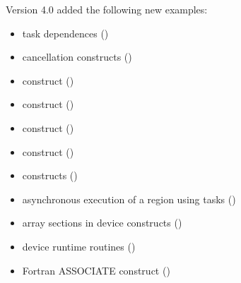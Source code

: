 Version 4.0 added the following new examples:
\begin{itemize}
\item task dependences ()
\item cancellation constructs ()
\item {} construct ()
\item {}  construct ()
\item {}  construct ()
\item {}  construct ()
\item {} constructs ()
\item asynchronous execution of a  region using tasks
 ()
\item array sections in device constructs ()
\item device runtime routines ()
\item Fortran ASSOCIATE construct ()
\end{itemize}

